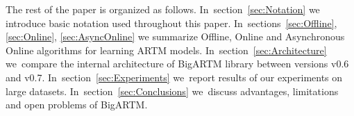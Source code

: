\documentclass[russian,english]{llncs}
\begin{document}


The rest of the paper is organized as follows.
In~section~\ref{sec:Notation}
we introduce basic notation used throughout this paper.
In~sections~\ref{sec:Offline}, \ref{sec:Online}, \ref{sec:AsyncOnline}
we summarize Offline, Online and Asynchronous Online algorithms for learning ARTM models.
In~section~\ref{sec:Architecture}
we~compare the internal architecture of BigARTM library between versions v0.6 and v0.7.
In~section~\ref{sec:Experiments}
we~report results of our experiments on large datasets.
In~section~\ref{sec:Conclusions}
we~discuss advantages, limitations and open problems of BigARTM.

\end{document}

